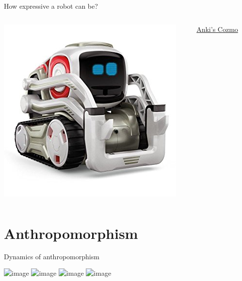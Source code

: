 \documentclass[compress]{beamer}
\begin{document}
\begin{frame}{How expressive a robot can be?}

    \begin{columns}
        \begin{column}{0.5\linewidth}
            \begin{center}
                \includegraphics[width=0.8\linewidth]{cozmo}
            \end{center}
        \end{column}
        \begin{column}{0.5\linewidth}
            \href{https://www.anki.com/en-gb/cozmo}{Anki's Cozmo}
        \end{column}
    \end{columns}
\end{frame}




\section{Anthropomorphism}



\begin{frame}{Dynamics of anthropomorphism}
    \begin{center}
        \includegraphics<1>[width=0.8\linewidth]{dynamics-0}
        \includegraphics<2>[width=0.8\linewidth]{dynamics-1}
        \includegraphics<3>[width=0.8\linewidth]{dynamics-2}
        \includegraphics<4>[width=0.8\linewidth]{dynamics-3}
    \end{center}
\end{frame}
\end{document}
